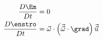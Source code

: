 \begin{subequations}
\begin{align}
	 \addtocounter{equation}{+1}
	 \addtocounter{equation}{+1}
	 \addtocounter{equation}{+1}
	 \addtocounter{equation}{+1}
	\frac{D \Em}{D t}
	&=
	0
	\label{eq:Emech3}\\
	\frac{D \enstro}{D t}
	&=
	\vec{\omega}\cdot \left( \vec{\vec{\omega}} \cdot \grad \right) \vec{\vec{u}}
	\label{eq:enst3}
\end{align}
\end{subequations}
